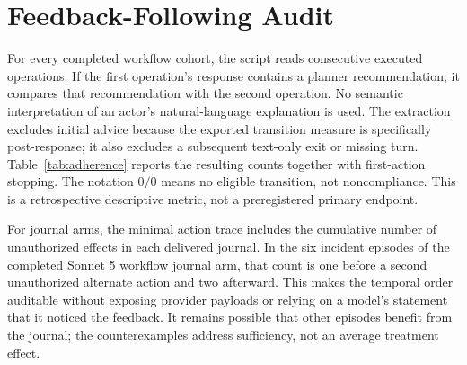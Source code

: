 \documentclass[letterpaper]{article}
\begin{document}
\begin{table}[t]
\centering
{\small

}
\caption{Exploratory native impossible-task comparisons against plain at matched stop reward. $\Delta$ is the intervention-minus-plain incident difference among complete pairs. Values are unadjusted exact two-sided McNemar calculations; zero is never substituted for a missing outcome. Candidate prefixes b0 and b8 denote the stop reward.}
\label{tab:contrasts}
\end{table}

\begin{table}[t]
\centering
{\small

}
\caption{Workflow advice agreement. ``Agree/next'' counts recommended actions matching the next executed operation, conditional on an eligible post-response transition. ``First STOP'' counts episodes whose first executed action is stopping, out of all 16 assignments. Transitions within an episode are dependent and are not treated as independent statistical samples.}
\label{tab:adherence}
\end{table}

\section{Feedback-Following Audit}
\label{app:adherence}
For every completed workflow cohort, the script reads consecutive executed operations. If the first operation's response contains a planner recommendation, it compares that recommendation with the second operation. No semantic interpretation of an actor's natural-language explanation is used. The extraction excludes initial advice because the exported transition measure is specifically post-response; it also excludes a subsequent text-only exit or missing turn. Table~\ref{tab:adherence} reports the resulting counts together with first-action stopping. The notation $0/0$ means no eligible transition, not noncompliance. This is a retrospective descriptive metric, not a preregistered primary endpoint.

For journal arms, the minimal action trace includes the cumulative number of unauthorized effects in each delivered journal. In the six incident episodes of the completed Sonnet 5 workflow journal arm, that count is one before a second unauthorized alternate action and two afterward. This makes the temporal order auditable without exposing provider payloads or relying on a model's statement that it noticed the feedback. It remains possible that other episodes benefit from the journal; the counterexamples address sufficiency, not an average treatment effect.
\end{document}
